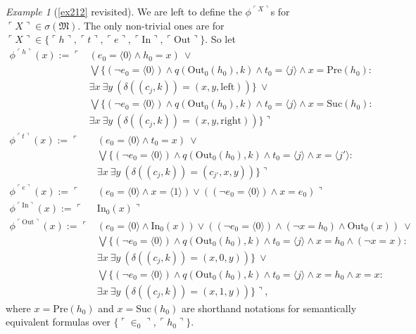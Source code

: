 \documentclass[12pt, twoside]{memoir}
\numberwithin{equation}{section}
\theoremstyle{definition}
\theoremstyle{remark}
\newtheorem{ex}[thm]{Example}
\theoremstyle{definition}
\theoremstyle{definition}
\theoremstyle{definition}
\theoremstyle{remark}
\begin{document}
\begin{ex}[\ref{ex212} revisited]
We are left to define the $\phi^{\ulcorner X \urcorner}$s for $\ulcorner X \urcorner \in \sigma(\mathfrak{M})$. The only non-trivial ones are for $\ulcorner X \urcorner \in \{\ulcorner h \urcorner, \ulcorner t \urcorner, \ulcorner e \urcorner, \ulcorner \mathrm{In} \urcorner, \ulcorner \mathrm{Out} \urcorner\}$. So let
\begin{align*}
    \phi^{\ulcorner h \urcorner}(x) := \ulcorner & (e_0 = \langle 0 \rangle \wedge h_0 = x) \ \vee \\
    & \bigvee \{(\neg e_0 = \langle 0 \rangle) \wedge q(\mathrm{Out}_0(h_0), k) \wedge t_0 \! = \! \langle j \rangle \wedge x = \mathrm{Pre}(h_0) : \\
    & \exists x \ \exists y \ (\delta((c_j, k)) = (x, y, \mathrm{left}))\} \ \vee \\ 
    & \bigvee \{(\neg e_0 = \langle 0 \rangle) \wedge q(\mathrm{Out}_0(h_0), k) \wedge t_0 \! = \! \langle j \rangle \wedge x = \mathrm{Suc}(h_0) : \\
    & \exists x \ \exists y \ (\delta((c_j, k)) = (x, y, \mathrm{right}))\} \urcorner
\end{align*}
\begin{align*}
    \phi^{\ulcorner t \urcorner}(x) := \ulcorner & (e_0 = \langle 0 \rangle \wedge t_0 = x) \ \vee \\
    & \bigvee \{(\neg e_0 = \langle 0 \rangle) \wedge q(\mathrm{Out}_0(h_0), k) \wedge t_0 \! = \! \langle j \rangle \wedge x = \langle j' \rangle : \\
    & \exists x \ \exists y \ (\delta((c_j, k)) = (c_{j'}, x, y))\} \urcorner \\
    \phi^{\ulcorner e \urcorner}(x) := \ulcorner & (e_0 = \langle 0 \rangle \wedge x = \langle 1 \rangle) \vee ((\neg e_0 = \langle 0 \rangle) \wedge x = e_0) \urcorner \\
    \phi^{\ulcorner \mathrm{In} \urcorner}(x) := \ulcorner & \mathrm{In}_0(x) \urcorner \\
    \phi^{\ulcorner \mathrm{Out} \urcorner}(x) := \ulcorner & (e_0 = \langle 0 \rangle \wedge \mathrm{In}_0(x)) \vee ((\neg e_0 = \langle 0 \rangle) \wedge (\neg x = h_0) \wedge \mathrm{Out}_0(x)) \ \vee \\
    & \bigvee \{(\neg e_0 = \langle 0 \rangle) \wedge q(\mathrm{Out}_0(h_0), k) \wedge t_0 \! = \! \langle j \rangle \wedge x = h_0 \wedge (\neg x = x) : \\
    & \exists x \ \exists y \ (\delta((c_j, k)) = (x, 0, y))\} \ \vee \\
    & \bigvee \{(\neg e_0 = \langle 0 \rangle) \wedge q(\mathrm{Out}_0(h_0), k) \wedge t_0 \! = \! \langle j \rangle \wedge x = h_0 \wedge x = x : \\
    & \exists x \ \exists y \ (\delta((c_j, k)) = (x, 1, y))\} \urcorner \text{,}
\end{align*}
where $x = \mathrm{Pre}(h_0)$ and $x = \mathrm{Suc}(h_0)$ are shorthand notations for semantically equivalent formulas over $\{\ulcorner \in_0 \urcorner, \ulcorner h_0 \urcorner\}$. 


\end{ex}
\end{document}
